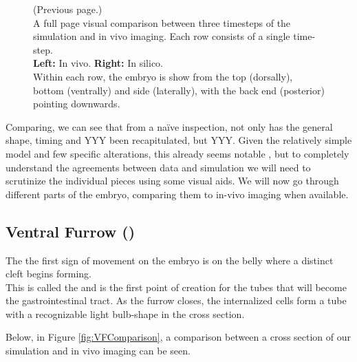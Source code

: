 \newpage
\addtocounter{figure}{-1}
\begin{figure} [t!]
  \caption{(Previous page.) \\A full page visual comparison between three timesteps of the simulation and in vivo imaging. 
  Each row consists of a single time-step. \\\textbf{Left:} In vivo. \textbf{Right:} In silico.\\Within each row, the embryo is show from the top (dorsally), bottom (ventrally) and side (laterally), with the back end (posterior) pointing downwards.
  }
\end{figure}

Comparing, we can see that from a naïve inspection, not only has the general shape, timing and YYY been recapitulated, but YYY.  Given the relatively simple model and few specific alterations, this already seems notable , but to completely understand the agreements between data and simulation we will need to scrutinize the individual pieces using some visual aids. We will now go through different parts of the embryo, comparing them to in-vivo imaging when available.


\subsection{Ventral Furrow ()}
The the first sign of movement on the embryo is on the belly where a distinct cleft begins forming. \\
This is called the  and is the first point of creation for the tubes that will become the gastrointestinal tract.
As the furrow closes, the internalized cells form a tube with a recognizable light bulb-shape in the cross section. 

Below, in Figure \ref{fig:VFComparison}, a comparison between a cross section of our simulation and in vivo imaging can be seen.

